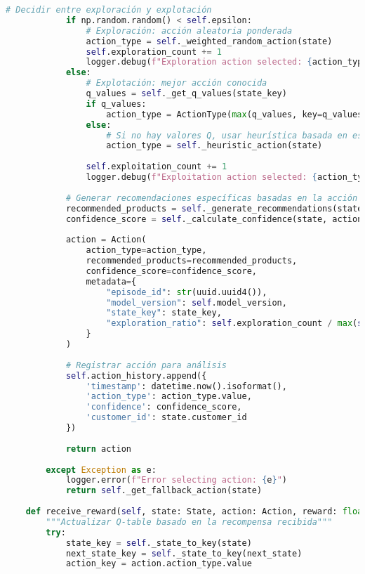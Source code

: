 \begin{lstlisting}[language=python, caption=Implementación Completa del Agente Q-Learning, label=lst:ql_implementation]
            # Decidir entre exploración y explotación
            if np.random.random() < self.epsilon:
                # Exploración: acción aleatoria ponderada
                action_type = self._weighted_random_action(state)
                self.exploration_count += 1
                logger.debug(f"Exploration action selected: {action_type}")
            else:
                # Explotación: mejor acción conocida
                q_values = self._get_q_values(state_key)
                if q_values:
                    action_type = ActionType(max(q_values, key=q_values.get))
                else:
                    # Si no hay valores Q, usar heurística basada en estado
                    action_type = self._heuristic_action(state)
                
                self.exploitation_count += 1
                logger.debug(f"Exploitation action selected: {action_type}")
            
            # Generar recomendaciones específicas basadas en la acción
            recommended_products = self._generate_recommendations(state, action_type)
            confidence_score = self._calculate_confidence(state, action_type, q_values)
            
            action = Action(
                action_type=action_type,
                recommended_products=recommended_products,
                confidence_score=confidence_score,
                metadata={
                    "episode_id": str(uuid.uuid4()),
                    "model_version": self.model_version,
                    "state_key": state_key,
                    "exploration_ratio": self.exploration_count / max(self.exploration_count + self.exploitation_count, 1)
                }
            )
            
            # Registrar acción para análisis
            self.action_history.append({
                'timestamp': datetime.now().isoformat(),
                'action_type': action_type.value,
                'confidence': confidence_score,
                'customer_id': state.customer_id
            })
            
            return action
            
        except Exception as e:
            logger.error(f"Error selecting action: {e}")
            return self._get_fallback_action(state)
    
    def receive_reward(self, state: State, action: Action, reward: float, next_state: State):
        """Actualizar Q-table basado en la recompensa recibida"""
        try:
            state_key = self._state_to_key(state)
            next_state_key = self._state_to_key(next_state)
            action_key = action.action_type.value
            

\end{lstlisting}
